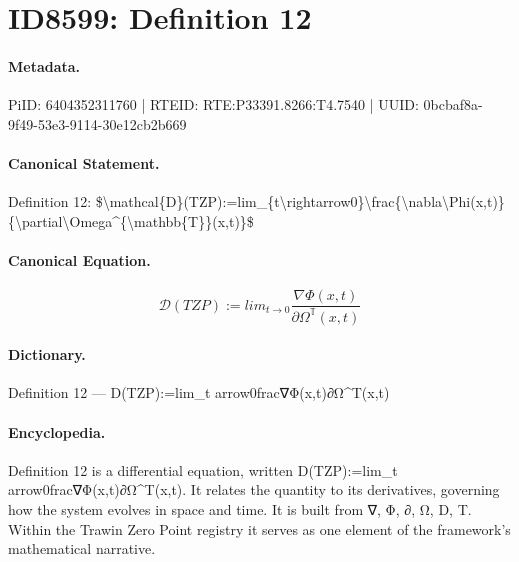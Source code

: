 \section*{ID8599: Definition 12}
\paragraph{Metadata.}
PiID: 6404352311760 | RTEID: RTE:P33391.8266:T4.7540 | UUID: 0bcbaf8a-9f49-53e3-9114-30e12cb2b669

\paragraph{Canonical Statement.}
Definition 12: \$\textbackslash{}mathcal\{D\}(TZP):=lim\_\{t\textbackslash{}rightarrow0\}\textbackslash{}frac\{\textbackslash{}nabla\textbackslash{}Phi(x,t)\}\{\textbackslash{}partial\textbackslash{}Omega\textasciicircum{}\{\textbackslash{}mathbb\{T\}\}(x,t)\}\$

\paragraph{Canonical Equation.}
\[
\mathcal{D}(TZP):=lim_{t\rightarrow0}\frac{\nabla\Phi(x,t)}{\partial\Omega^{\mathbb{T}}(x,t)}
\]

\paragraph{Dictionary.}
Definition 12 — D(TZP):=lim\_t arrow0frac∇Φ(x,t)∂Ω\textasciicircum{}T(x,t)

\paragraph{Encyclopedia.}
Definition 12 is a differential equation, written D(TZP):=lim\_t arrow0frac∇Φ(x,t)∂Ω\textasciicircum{}T(x,t). It relates the quantity to its derivatives, governing how the system evolves in space and time. It is built from ∇, Φ, ∂, Ω, D, T. Within the Trawin Zero Point registry it serves as one element of the framework's mathematical narrative.
